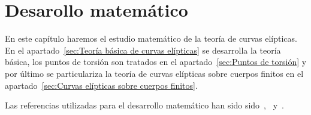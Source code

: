 \chapter{Desarollo matemático}
\label{ch:Desarollo matemático}



En este capítulo haremos el estudio matemático de la teoría de curvas elípticas. En el apartado~\ref{sec:Teoría básica de curvas elípticas} se desarrolla la teoría básica, los puntos de torsión son tratados en el apartado~\ref{sec:Puntos de torsión} y por último se particulariza la teoría de curvas elípticas sobre cuerpos finitos en el apartado~\ref{sec:Curvas elípticas sobre cuerpos finitos}.

Las referencias utilizadas para el desarrollo matemático han sido sido~\cite{Washington:2008},~\cite{Hankerson:2003} y~\cite{Silverman:2009}.




